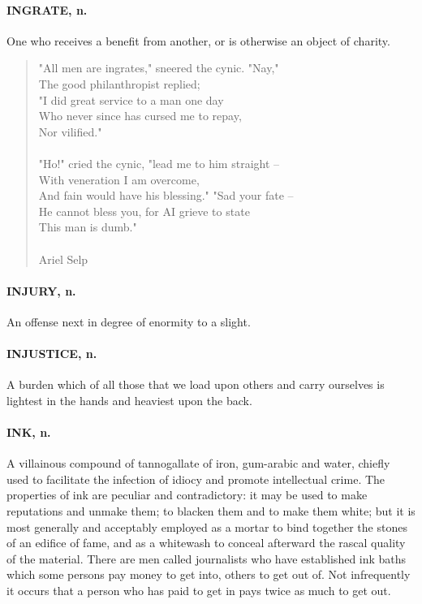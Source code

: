 \documentclass[11pt]{article}
\begin{document}
\paragraph{INGRATE, n.}  One who receives a benefit from another, or is otherwise
an object of charity.

\begin{quote}   "All men are ingrates," sneered the cynic.  "Nay," \\
      The good philanthropist replied; \\
  "I did great service to a man one day \\
  Who never since has cursed me to repay, \\
              Nor vilified." \\
 \\
  "Ho!" cried the cynic, "lead me to him straight -- \\
      With veneration I am overcome, \\
  And fain would have his blessing."  "Sad your fate -- \\
  He cannot bless you, for AI grieve to state \\
              This man is dumb." \\
 \\
Ariel Selp \end{quote}


\paragraph{INJURY, n.}  An offense next in degree of enormity to a slight.

\paragraph{INJUSTICE, n.}  A burden which of all those that we load upon others
and carry ourselves is lightest in the hands and heaviest upon the
back.

\paragraph{INK, n.}  A villainous compound of tannogallate of iron, gum-arabic and
water, chiefly used to facilitate the infection of idiocy and promote
intellectual crime.  The properties of ink are peculiar and
contradictory:  it may be used to make reputations and unmake them; to
blacken them and to make them white; but it is most generally and
acceptably employed as a mortar to bind together the stones of an
edifice of fame, and as a whitewash to conceal afterward the rascal
quality of the material.  There are men called journalists who have
established ink baths which some persons pay money to get into, others
to get out of.  Not infrequently it occurs that a person who has paid
to get in pays twice as much to get out.
\end{document}
